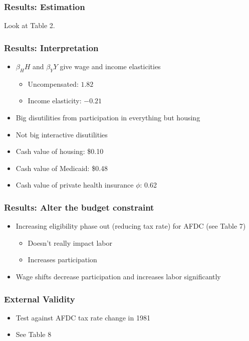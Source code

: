 \documentclass{beamer}
\begin{document}
\begin{frame}
\frametitle[alignment=center]{Results: Estimation}
Look at Table 2.
\end{frame}

\begin{frame}
\frametitle[alignment=center]{Results: Interpretation}
\begin{itemize}
\item $\beta_HH$ and $\beta_YY$ give wage and income elasticities
\begin{itemize}
\item Uncompensated: $1.82$ 
\item Income elasticity: $-0.21$ 
\end{itemize}
\item Big disutilities from participation in everything but housing
\bigskip
\item Not big interactive disutilities
\bigskip
\item Cash value of housing: \$0.10
\bigskip
\item Cash value of Medicaid: \$0.48
\bigskip
\item Cash value of private health insurance $\phi$: 0.62
\bigskip
\end{itemize}
\end{frame}

\begin{frame}
\frametitle[alignment=center]{Results: Alter the budget constraint}
\begin{itemize}
\item Increasing eligibility phase out (reducing tax rate) for AFDC (see Table 7)
\bigskip
\begin{itemize}
\item Doesn't really impact labor
\bigskip
\item Increases participation
\end{itemize}
\item Wage shifts decrease participation and increases labor significantly
\end{itemize}
\end{frame}


\begin{frame}
\frametitle[alignment=center]{External Validity}
\begin{itemize}
\item Test against AFDC tax rate change in 1981
\bigskip
\item See Table 8
\end{itemize}
\end{frame}
\end{document}
